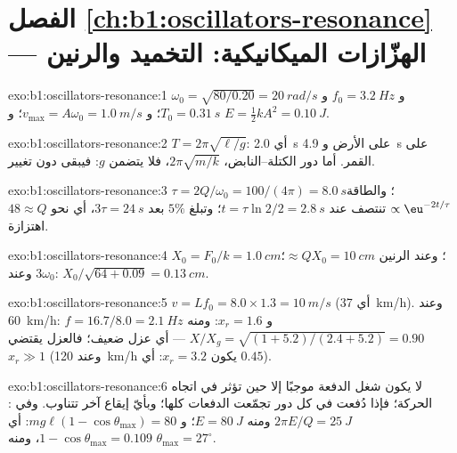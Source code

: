 \section*{الفصل \ref{ch:b1:oscillators-resonance} --- الهزّازات الميكانيكية: التخميد والرنين}

\begin{solution}{exo:b1:oscillators-resonance:1}
$\omega_0 = \sqrt{80/0.20} = \qty{20}{rad/s}$ و $f_0 = \qty{3.2}{Hz}$ و $T_0 =
\qty{0.31}{s}$؛ و $v_{\max} = A\omega_0 = \qty{1.0}{m/s}$؛ و $E = \tfrac12 kA^2 =
\qty{0.10}{J}$.
\end{solution}

\begin{solution}{exo:b1:oscillators-resonance:2}
$T = 2\pi\sqrt{\ell/g}$: أي \qty{2.0}{s} على الأرض و \qty{4.9}{s} على القمر.
أما دور الكتلة--النابض، $2\pi\sqrt{m/k}$، فلا يتضمن $g$:
فيبقى دون تغيير.
\end{solution}

\begin{solution}{exo:b1:oscillators-resonance:3}
$\tau = 2Q/\omega_0 = 100/(4\pi) = \qty{8.0}{s}$؛ والطاقة $\propto \eu^{-2t/\tau}$
تنتصف عند $t = \tau\ln2/2 = \qty{2.8}{s}$؛ وتبلغ $5\%$ بعد $3\tau = \qty{24}{s}$،
أي نحو $48 \approx Q$ اهتزازة.
\end{solution}

\begin{solution}{exo:b1:oscillators-resonance:4}
$X_0 = F_0/k = \qty{1.0}{cm}$؛ وعند الرنين $\approx QX_0 = \qty{10}{cm}$؛
وعند $3\omega_0$: $X_0/\sqrt{64 + 0.09} = \qty{0.13}{cm}$.
\end{solution}

\begin{solution}{exo:b1:oscillators-resonance:5}
$v = Lf_0 = 8.0 \times 1.3 = \qty{10}{m/s}$ (أي \qty{37}{km/h}). وعند
\qty{60}{km/h}: $f = 16.7/8.0 = \qty{2.1}{Hz}$ و $x_r = 1.6$: ومنه $X/X_g =
\sqrt{(1 + 5.2)/(2.4 + 5.2)} = 0.90$ --- أي عزل ضعيف؛ فالعزل
يقتضي $x_r \gg 1$ (وعند \qty{120}{km/h} يكون $x_r = 3.2$: أي $0.45$).
\end{solution}

\begin{solution}{exo:b1:oscillators-resonance:6}
لا يكون شغل الدفعة موجبًا إلا حين تؤثر في اتجاه الحركة؛
فإذا دُفعت في كل دور تجمّعت الدفعات كلها؛ وبأيّ إيقاع آخر
تتناوب. وفي : $2\pi E/Q = \qty{25}{J}$ ومنه $E = \qty{80}{J}$؛
و $mg\ell(1 - \cos\theta_{\max}) = 80$: أي $1 - \cos\theta_{\max} = 0.109$،
ومنه $\theta_{\max} = 27^\circ$.
\end{solution}

